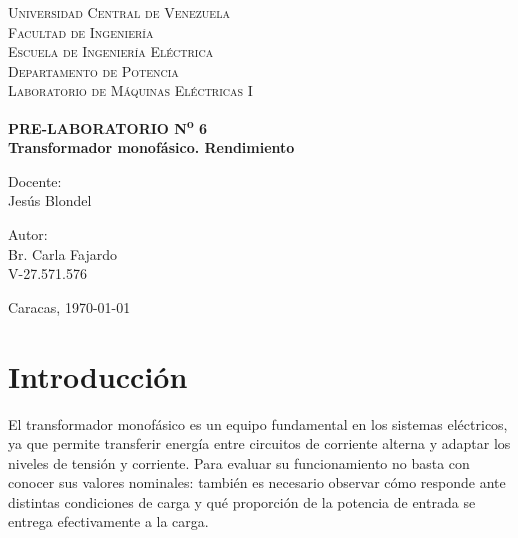 \documentclass[12pt]{article}
\begin{document}
\thispagestyle{empty}

\begin{center}
    \textsc{Universidad Central de Venezuela}\\[0.35cm]
    \textsc{Facultad de Ingenier\'ia}\\[0.35cm]
    \textsc{Escuela de Ingenier\'ia El\'ectrica}\\[0.35cm]
    \textsc{Departamento de Potencia}\\[0.35cm]
    \textsc{Laboratorio de M\'aquinas El\'ectricas I}
\end{center}

\vspace{6.8cm}

\begin{center}
    \textbf{PRE-LABORATORIO N\textsuperscript{o} 6}\\[0.35cm]
    \textbf{Transformador monof\'asico. Rendimiento}
\end{center}

\vfill

\noindent
\begin{minipage}[t]{0.48\textwidth}
    Docente:\\[0.25cm]
    Jes\'us Blondel
\end{minipage}%
\hfill
\begin{minipage}[t]{0.48\textwidth}
    \raggedleft
    Autor:\\[0.25cm]
    Br. Carla Fajardo\\[0.25cm]
    V-27.571.576
\end{minipage}

\vspace{1.1cm}

\begin{center}
    Caracas, \today
\end{center}

\newpage

\section{Introducci\'on}
El transformador monof\'asico es un equipo fundamental en los sistemas el\'ectricos, ya que permite transferir energ\'ia entre circuitos de corriente alterna y adaptar los niveles de tensi\'on y corriente. Para evaluar su funcionamiento no basta con conocer sus valores nominales: tambi\'en es necesario observar c\'omo responde ante distintas condiciones de carga y qu\'e proporci\'on de la potencia de entrada se entrega efectivamente a la carga.
\end{document}

